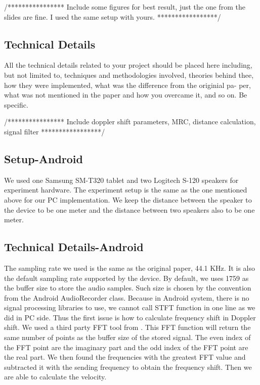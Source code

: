 \documentclass{acm_proc_article-sp}
\begin{document}
/****************
Include some figures for best result, just the one from
the slides are fine. I used the same setup with yours.
*****************/

\subsection{Technical Details} \label{technical_details}
All  the  technical  details  related  to  your  project  should  be
placed  here  including,  but  not  limited  to,  techniques  and
methodologies involved, theories behind thee, how they were
implemented, what was the difference from the originial pa-
per,  what  was  not  mentioned  in  the  paper  and  how  you
overcame it, and so on.  Be specific.

/****************
Include doppler shift parameters, MRC, distance calculation, signal filter
*****************/


\subsection{Setup-Android}
We used one Samsung SM-T320 tablet and two Logitech S-120 speakers for experiment 
hardware. The experiment setup is the same as the one mentioned above for our PC 
implementation. We keep the distance between the speaker to the device to be one meter
and the distance between two speakers also to be one meter. 

\subsection{Technical Details-Android}
The sampling rate we used is the same as the original paper, 44.1 KHz. It is also the 
default sampling rate supported by the device. By default, we uses 1759 as the buffer
size to store the audio samples. Such size is chosen by the convention from the 
Android AudioRecorder class. 
Because in Android system, there is no signal processing libraries to use, we cannot 
call STFT function in one line as we did in PC side. Thus the first issue is how to 
calculate frequency shift in Doppler shift. We used a third party FFT tool from 
\cite{FFT}. This FFT function will return the same number of points as the buffer size
of the stored signal. The even index of the FFT point are the imaginary part and the odd 
index of the FFT point are the real part. We then found the frequencies with the greatest
FFT value and subtracted it with the sending frequency to obtain the frequency shift. 
Then we are able to calculate the velocity. 
\end{document}
